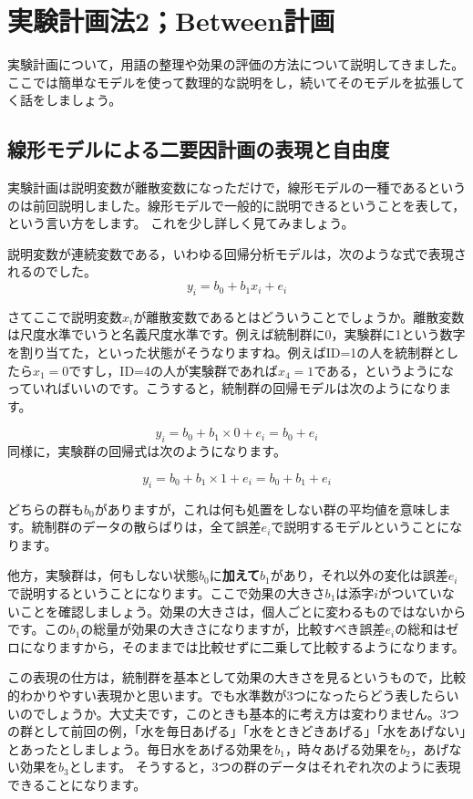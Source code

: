 \documentclass{ltjbook}
\begin{document}
 
\chapter{実験計画法2；Between計画} 
\label{chapter13} 

実験計画について，用語の整理や効果の評価の方法について説明してきました。
ここでは簡単なモデルを使って数理的な説明をし，続いてそのモデルを拡張してく話をしましょう。

\section{線形モデルによる二要因計画の表現と自由度}
\label{GeneralLinearModel}
実験計画は説明変数が離散変数になっただけで，線形モデルの一種であるというのは前回説明しました。線形モデルで一般的に説明できるということを表して，という言い方をします。
これを少し詳しく見てみましょう。

説明変数が連続変数である，いわゆる回帰分析モデルは，次のような式で表現されるのでした。
\[ y_i = b_0 + b_1 x_i + e_i \]

さてここで説明変数$x_{i}$が離散変数であるとはどういうことでしょうか。離散変数は尺度水準でいうと名義尺度水準です。例えば統制群に0，実験群に1という数字を割り当てた，といった状態がそうなりますね。例えばID=1の人を統制群としたら$x_1=0$ですし，ID=4の人が実験群であれば$x_4=1$である，というようになっていればいいのです。こうすると，統制群の回帰モデルは次のようになります。

\[ y_i = b_0 + b_1 \times 0 + e_i = b_0 + e_i \]
同様に，実験群の回帰式は次のようになります。

\[ y_i = b_0 + b_1 \times 1 + e_i = b_0 + b_1 + e_i \]

どちらの群も$b_0$がありますが，これは何も処置をしない群の平均値を意味します。統制群のデータの散らばりは，全て誤差$e_i$で説明するモデルということになります。

他方，実験群は，何もしない状態$b_0$に\textbf{加えて}$b_1$があり，それ以外の変化は誤差$e_i$で説明するということになります。ここで効果の大きさ$b_1$は添字$i$がついていないことを確認しましょう。効果の大きさは，個人ごとに変わるものではないからです。この$b_1$の総量が効果の大きさになりますが，比較すべき誤差$e_i$の総和はゼロになりますから，そのままでは比較せずに二乗して比較するようになります。

この表現の仕方は，統制群を基本として効果の大きさを見るというもので，比較的わかりやすい表現かと思います。でも水準数が3つになったらどう表したらいいのでしょうか。大丈夫です，このときも基本的に考え方は変わりません。3つの群として前回の例，「水を毎日あげる」「水をときどきあげる」「水をあげない」とあったとしましょう。毎日水をあげる効果を$b_1$，時々あげる効果を$b_2$，あげない効果を$b_3$とします。
そうすると，3つの群のデータはそれぞれ次のように表現できることになります。
\end{document}
